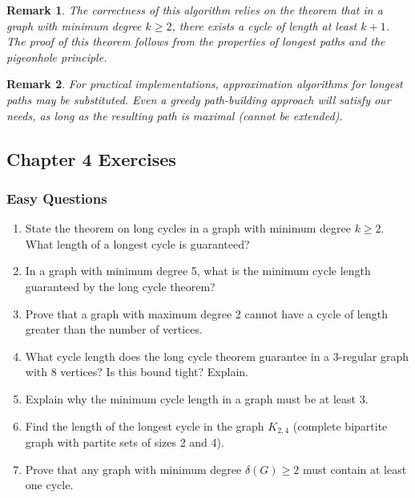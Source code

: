 \documentclass{article}
\newtheorem{remark}{Remark}
\theoremstyle{definition}
\begin{document}
\begin{remark}
The correctness of this algorithm relies on the theorem that in a graph with minimum degree $k \geq 2$, there exists a cycle of length at least $k+1$. The proof of this theorem follows from the properties of longest paths and the pigeonhole principle.
\end{remark}

\begin{remark}
For practical implementations, approximation algorithms for longest paths may be substituted. Even a greedy path-building approach will satisfy our needs, as long as the resulting path is maximal (cannot be extended).
\end{remark}

\subsection{Chapter 4 Exercises}

\subsubsection{Easy Questions}
\begin{enumerate}
\item State the theorem on long cycles in a graph with minimum degree $k \geq 2$. What length of a longest cycle is guaranteed?

\item In a graph with minimum degree 5, what is the minimum cycle length guaranteed by the long cycle theorem?

\item Prove that a graph with maximum degree 2 cannot have a cycle of length greater than the number of vertices.

\item What cycle length does the long cycle theorem guarantee in a 3-regular graph with 8 vertices? Is this bound tight? Explain.

\item Explain why the minimum cycle length in a graph must be at least 3.

\item Find the length of the longest cycle in the graph $K_{2,4}$ (complete bipartite graph with partite sets of sizes 2 and 4).

\item Prove that any graph with minimum degree $\delta(G) \geq 2$ must contain at least one cycle.
\end{enumerate}
\end{document}

